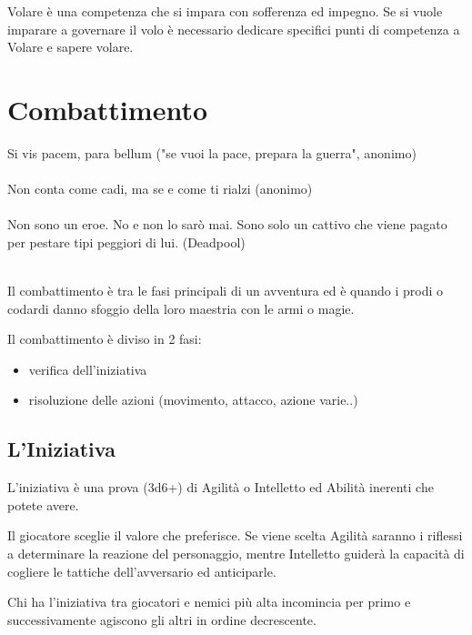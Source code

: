 \documentclass[a4paper,11pt,twoside,openany]{book}
\begin{document}
Volare è una competenza che si impara con sofferenza ed impegno. Se si vuole imparare a governare il volo è necessario dedicare specifici punti di competenza a Volare e sapere volare.

\pagebreak

\section{Combattimento}

\label{combattimento}
\begin{tcolorbox}[enhanced,arc=5pt,boxrule=0.3pt]{
		Si vis pacem, para bellum ("se vuoi la pace, prepara la guerra", anonimo)\\\\
		Non conta come cadi, ma se e come ti rialzi (anonimo)\\\\
		Non sono un eroe. No e non lo sarò mai. Sono solo un cattivo che viene pagato per pestare tipi peggiori di lui. (Deadpool)\\\\
	}\end{tcolorbox}\medskip

Il combattimento è tra le fasi principali di un avventura ed è quando i prodi o codardi danno sfoggio della loro maestria con le armi o magie.

\bigskip

Il combattimento è diviso in 2 fasi:
\begin{itemize}
	\item verifica dell'iniziativa
	\item risoluzione delle azioni (movimento, attacco, azione varie..)
\end{itemize}

\subsection{L'Iniziativa}

\label{liniziativa}

L'iniziativa è una prova (3d6+) di Agilità o Intelletto ed Abilità inerenti che potete avere.

Il giocatore sceglie il valore che preferisce. Se viene scelta Agilità saranno i riflessi a determinare la reazione del personaggio, mentre Intelletto guiderà la capacità di cogliere le tattiche dell'avversario ed anticiparle.

Chi ha l'iniziativa tra giocatori e nemici più alta incomincia per primo e successivamente agiscono gli altri in ordine decrescente.
\end{document}
